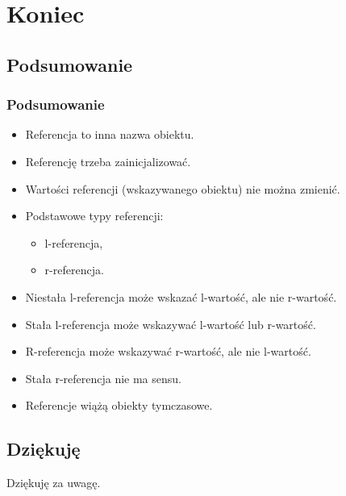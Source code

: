 \documentclass[compress]{beamer}
\begin{document}

\section{Koniec}

\subsection{Podsumowanie}

\begin{frame}

  \frametitle{Podsumowanie}

  \begin{itemize}
  \item Referencja to inna nazwa obiektu.
  \item Referencję trzeba zainicjalizować.
  \item Wartości referencji (wskazywanego obiektu) nie można zmienić.
  \item Podstawowe typy referencji:
    \begin{itemize}
    \item l-referencja,
    \item r-referencja.
    \end{itemize}
  \item Niestała l-referencja może wskazać l-wartość, ale nie r-wartość.
  \item Stała l-referencja może wskazywać l-wartość lub r-wartość.
  \item R-referencja może wskazywać r-wartość, ale nie l-wartość.
  \item Stała r-referencja nie ma sensu.
  \item Referencje wiążą obiekty tymczasowe.
  \end{itemize}

\end{frame}


\subsection{Dziękuję}

\begin{frame}[plain]

  \begin{center}
    \huge Dziękuję za uwagę.
  \end{center}

\end{frame}
\end{document}
